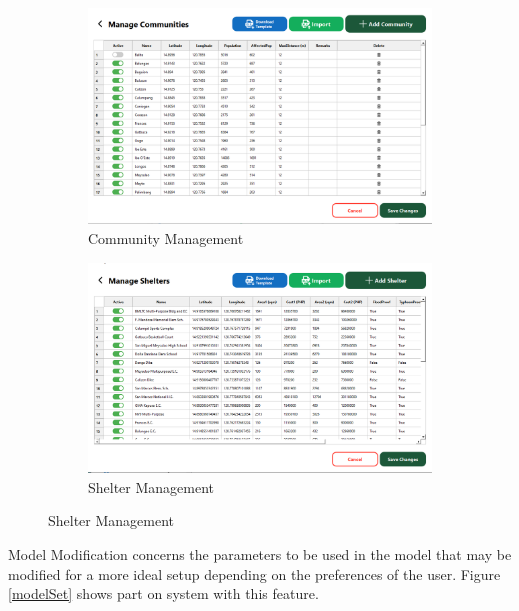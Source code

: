 \documentclass[11pt,letterpaper,]{article}
\begin{document}
\begin{figure}[H]
		\vspace{0.1cm}
		\begin{subfigure}{0.3\textwidth}
			\caption{Community Management}
			\label{commMan}
			\centering
			\includegraphics[width=\linewidth]{Chapter 4/commadvanced}
		\end{subfigure}
		\hspace{0.5cm}
		\begin{subfigure}{0.3\textwidth}
			\caption{Shelter Management}
			\label{shelMan}
			\centering
			\includegraphics[width=\linewidth]{Chapter 4/sheladvanced}
		\end{subfigure}
		
	\end{figure}
	

	
	Model Modification concerns the parameters to be used in the model that may be modified for a more ideal setup depending on the preferences of the user.   Figure \ref{modelSet} shows part on system with this feature.
	
\end{document}
